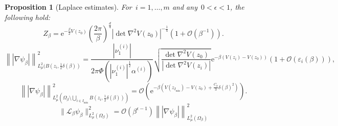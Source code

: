 \documentclass[10pt]{article}
\newcommand{\cL}{\mathcal{L}}
\newcommand{\e}{\mathrm{e}}
\newcommand{\1}{\mathbbm 1}
\newcommand{\largeRadius}{\delta}
\newcommand{\epsLimit}[1]{\alpha^{(#1)}} %
\newcommand{\localCuboid}[1]{\mathcal R_{#1}}
\newcommand{\hessEigval}[2]{\nu^{(#1)}_{#2}} %
\renewcommand{\O}{\mathcal{O}}
\newtheorem{proposition}{Proposition}
\begin{document}
        \begin{proposition}[Laplace estimates]
            For~$i=1,\dots,m$ and any~$0<\epsilon<1$, the following hold:
            \begin{equation}
                \label{eq:laplace_a}
                Z_\beta = \e^{-\frac{\beta}2 V(z_0)} \left(\frac{2\pi}{\beta}\right)^{\frac d4}|\det \nabla^2 V(z_0)|^{-\frac14}\left(1+\O(\beta^{-1})\right).
            \end{equation}
            \begin{equation}
                \label{eq:laplace_b}
                \left\||\nabla \psi_\beta|\right\|^2_{L_\mu^2(B\left(z_i,\frac12\largeRadius(\beta)\right)} = \frac{|\hessEigval{i}{1}|}{2\pi\Phi\left(|\hessEigval{i}{1}|^{\frac12}\epsLimit{i}\right)}\sqrt{\frac{\det \nabla^2 V(z_0)}{\left|\det \nabla ^2 V(z_i)\right|}} \e^{-\beta(V(z_i)-V(z_0))} \left(1 +\O(\varepsilon_i(\beta))\right),
            \end{equation}
            \begin{equation}
                \label{eq:laplace_d}
                \left\||\nabla \psi_\beta|\right\|^2_{L_\mu^2\left(\Omega_\beta \setminus \bigcup_{i\in{I_{\min}}} B\left(z_i,\frac12\largeRadius(\beta)\right)\right)} = \O\left(\e^{-\beta\left(V(z_{I_{\min}}) - V(z_0) +\frac{C_\eta}3 \largeRadius(\beta)^2\right)}\right).
            \end{equation}
            \begin{equation}
                \label{eq:laplace_c}
                \|\cL_\beta \psi_\beta\|^2_{L_\mu^2(\Omega_\beta)} = \O(\beta^{\epsilon-1})\left\||\nabla\psi_\beta|\right\|^2_{L_\mu^2(\Omega_\beta)}
            \end{equation}
            

        \end{proposition}
\end{document}
